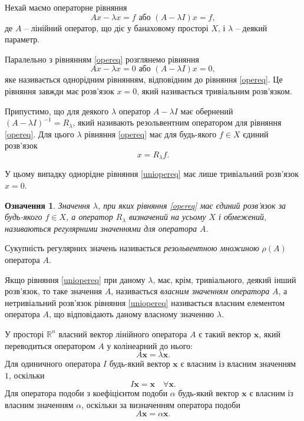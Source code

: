 \documentclass[14pt,twoside]{extreport}
\theoremstyle{mystyle}
\newtheorem{dfn}{Означення}
\numberwithin{equation}{chapter}
\begin{document}
Нехай маємо операторне рівняння
\begin{equation}\label{opereq}
Ax - \lambda x = f \textrm{ або } (A - \lambda I)x = f,
\end{equation}
де $A$ -- лінійний оператор, що діє у банаховому просторі $X$, і $\lambda$ -- деякий параметр.

Паралельно з рівнянням \eqref{opereq} розглянемо рівняння
\begin{equation}\label{uniopereq}
Ax - \lambda x = 0 \textrm{ або } (A - \lambda I)x = 0,
\end{equation}
яке називається однорідним рівнянням, відповідним до рівняння \eqref{opereq}. Це рівняння завжди має розв'язок $x = 0$, який називається тривіальним розв'язком.

Припустимо, що для деякого $\lambda$ оператор $A-\lambda I$ має обернений $(A - \lambda I)^{-1} = R_\lambda$, який називають резольвентним оператором для рівняння \eqref{opereq}. Для цього $\lambda$ рівняння \eqref{opereq} має для будь-якого $f\in X$ єдиний розв'язок
\[
x=R_\lambda f.
\]

У цьому випадку однорідне рівняння \eqref{uniopereq} має лише тривіальний розв'язок $x=0$.
\begin{dfn}
	Значення $\lambda$, при яких рівняння \eqref{opereq} має єдиний розв'язок за будь-якого $f \in X$, а оператор $R_\lambda$ визначений на усьому $X$ і обмежений, називаються регулярними значеннями для оператора $A$.
\end{dfn}

Сукупність регулярних значень називається \emph{резольвентною множиною} $\rho(A)$ оператора $A$.

Якщо рівняння \eqref{uniopereq} при даному $\lambda$, має, крім, тривіального, деякий інший розв'язок, то таке значення $A$, називається \emph{власним значенням оператора} $A$, а нетривіальний розв'язок рівняння \eqref{uniopereq} називається власним елементом оператора $A$, що відповідають даному власному значенню $\lambda$.

У просторі $\mathbb{R}^n$ власний вектор лінійного оператора $A$ є такий вектор $\mathbf{x}$, який переводиться оператором $A$ у колінеарний до нього:
\[
A\mathbf{x}=\lambda \mathbf{x}.
\]
Для одиничного оператора $I$ будь-який вектор $\mathbf{x}$ є власним із власним значенням $1$, оскільки
\[
I\mathbf{x} = \mathbf{x} \quad \forall \mathbf{x}.
\]
Для оператора подоби з коефіцієнтом подоби $\alpha$ будь-який вектор $\mathbf{x}$ є власним із власним значенням $\alpha$, оскільки за визначенням оператора подоби
\[
A\mathbf{x} = \alpha \mathbf{x}.
\]
\end{document}
